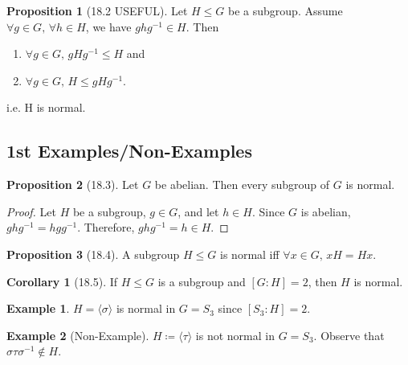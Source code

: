 \documentclass{article}
\newcommand{\coleq}{\coloneqq}
\newcommand{\inverse}[1]{#1^{-1}}
\theoremstyle{definition}
\newtheorem*{cor}{Corollary}
\newtheorem*{prop}{Proposition}
\newtheorem*{ex}{Example}
\theoremstyle{remark}
\newcommand{\cyc}[1]{\langle#1\rangle}
\begin{document}
{        \begin{prop}[18.2 USEFUL]
            Let $H \leq G$ be a subgroup. Assume $\forall g \in G, \, \forall h \in H$, we have $gh\inverse{g}\in H$. Then
            \begin{enumerate}
                \item $\forall g \in G, \, gH\inverse{g}\leq H$ and
                \item $\forall g \in G, \, H \leq gH\inverse{g}$.
            \end{enumerate}
            i.e. H is normal.
        \end{prop}
        
        \subsection*{1st Examples/Non-Examples}{
            \begin{prop}[18.3]
                Let $G$ be abelian. Then every subgroup of $G$ is normal.
            \end{prop}
            
            \begin{proof}
                Let $H$ be a subgroup, $g \in G$, and let $h \in H$. Since $G$ is abelian, $gh\inverse{g}=hg\inverse{g}$. Therefore, $gh\inverse{g}=h \in H$.
            \end{proof}
            
            \begin{prop}[18.4]
                A subgroup $H\leq G$ is normal iff $\forall x \in G, \, xH=Hx$.
            \end{prop}
            
            \begin{cor}[18.5]
                If $H \leq G$ is a subgroup and $[G:H]=2$, then $H$ is normal.
            \end{cor}
            
            \begin{ex}
                $H=\cyc{\sigma}$ is normal in $G=S_3$ since $[S_3:H]=2$.
            \end{ex}
            
            \begin{ex}[Non-Example]
                $H \coleq \cyc{\tau}$ is not normal in $G=S_3$. Observe that $\sigma\tau\inverse{\sigma} \notin H$.
            \end{ex}
        }
    }
    
\end{document}
